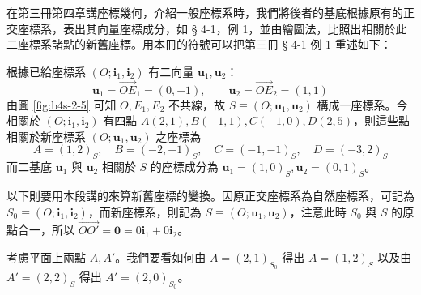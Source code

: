 \begin{example}[論例 1]
在第三冊第四章講座標幾何，介紹一般座標系時，我們將後者的基底根據原有的正交座標系，表出其向量座標成分，如 § 4-1，例 1，並由繪圖法，比照出相關於此二座標系諸點的新舊座標。用本冊的符號可以把第三冊 § 4-1 例 1 重述如下：

根據已給座標系 $(O; \mathbf{i}_1, \mathbf{i}_2)$ 有二向量 $\mathbf{u}_1, \mathbf{u}_2$：
\[ \mathbf{u}_1 = \vec{OE}_1 = (0, -1), \qquad \mathbf{u}_2 = \vec{OE}_2 = (1, 1) \]
由圖 \ref{fig:b4s-2-5} 可知 $O, E_1, E_2$ 不共線，故 $S \equiv (O; \mathbf{u}_1, \mathbf{u}_2)$ 構成一座標系。今相關於 $(O; \mathbf{i}_1, \mathbf{i}_2)$ 有四點 $A(2, 1), B(-1, 1), C(-1, 0), D(2, 5)$，則這些點相關於新座標系 $(O; \mathbf{u}_1, \mathbf{u}_2)$ 之座標為
\[ A = (1, 2)_S, \quad B = (-2, -1)_S, \quad C = (-1, -1)_S, \quad D = (-3, 2)_S \]
而二基底 $\mathbf{u}_1$ 與 $\mathbf{u}_2$ 相關於 $S$ 的座標成分為 $\mathbf{u}_1 = (1, 0)_S, \mathbf{u}_2 = (0, 1)_S$。

以下則要用本段講的來算新舊座標的變換。因原正交座標系為自然座標系，可記為 $S_0 \equiv (O; \mathbf{i}_1, \mathbf{i}_2)$，而新座標系，則記為 $S \equiv (O; \mathbf{u}_1, \mathbf{u}_2)$，注意此時 $S_0$ 與 $S$ 的原點合一，所以 $\vec{OO'} = \mathbf{0} = 0\mathbf{i}_1 + 0\mathbf{i}_2$。

考慮平面上兩點 $A, A'$。我們要看如何由 $A = (2, 1)_{S_0}$ 得出 $A = (1, 2)_S$ 以及由 $A' = (2, 2)_S$ 得出 $A' = (2, 0)_{S_0}$。
\end{example}

